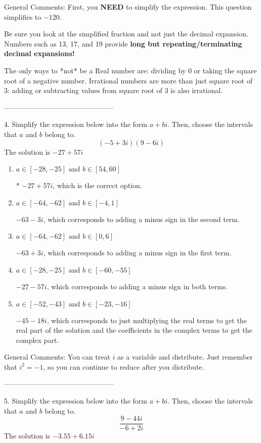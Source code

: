 \documentclass{extbook}[14pt]
\begin{document}
General Comments: First, you \textbf{NEED} to simplify the expression. This question simplifies to $-120$. 
 
 Be sure you look at the simplified fraction and not just the decimal expansion. Numbers such as 13, 17, and 19 provide \textbf{long but repeating/terminating decimal expansions!} 
 
 The only ways to *not* be a Real number are: dividing by 0 or taking the square root of a negative number. Irrational numbers are more than just square root of 3: adding or subtracting values from square root of 3 is also irrational.

-----------------------------------------------

4. Simplify the expression below into the form $a+bi$. Then, choose the intervals that $a$ and $b$ belong to.
\[ (-5  + 3 i)(9  - 6 i) \] 
The solution is $ -27  + 57 i $ 

\begin{enumerate}[label=\Alph*.] 
\item $ a \in [-28, -25] \text{ and } b \in [54, 60] $ 

 * $-27  + 57 i$, which is the correct option. 
\item $ a \in [-64, -62] \text{ and } b \in [-4, 1] $ 

  $-63  - 3 i$, which corresponds to adding a minus sign in the second term. 
\item $ a \in [-64, -62] \text{ and } b \in [0, 6] $ 

  $-63  + 3 i$, which corresponds to adding a minus sign in the first term. 
\item $ a \in [-28, -25] \text{ and } b \in [-60, -55] $ 

  $-27  - 57 i$, which corresponds to adding a minus sign in both terms. 
\item $ a \in [-52, -43] \text{ and } b \in [-23, -16] $ 

  $-45  - 18 i$, which corresponds to just multiplying the real terms to get the real part of the solution and the coefficients in the complex terms to get the complex part. 
\end{enumerate} 
 
General Comments: You can treat $i$ as a variable and distribute. Just remember that $i^2=-1$, so you can continue to reduce after you distribute.

-----------------------------------------------

5. Simplify the expression below into the form $a+bi$. Then, choose the intervals that $a$ and $b$ belong to.
\[ \frac{9  - 44 i}{-6  + 2 i} \] 
The solution is $ -3.55  + 6.15 i $ 
\end{document}
